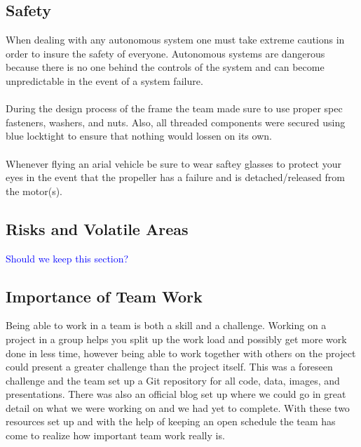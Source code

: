 \documentclass{article}
\numberwithin{equation}{section} %
\begin{document}
\subsection{Safety}
When dealing with any autonomous system one must take extreme cautions in order to insure the safety of everyone. Autonomous systems are dangerous because there is no one behind the controls of the system and can become unpredictable in the event of a system failure. \\ \\ 
During the design process of the frame the team made sure to use proper spec fasteners, washers, and nuts. Also, all threaded components were secured using blue locktight to ensure that nothing would lossen on its own. \\ \\
Whenever flying an arial vehicle be sure to wear saftey glasses to protect your eyes in the event that the propeller has a failure and is detached/released from the motor(s).

\subsection{Risks and Volatile Areas}

\textcolor{blue}{Should we keep this section?}

\subsection{Importance of Team Work}
Being able to work in a team is both a skill and a challenge. Working on a project in a group helps you split up the work load and possibly get more work done in less time, however being able to work together with others on the project could present a greater challenge than the project itself. This was a foreseen challenge and the team set up a Git repository for all code, data, images, and presentations. There was also an official blog set up where we could go in great detail on what we were working on and we had yet to complete. With these two resources set up and with the help of keeping an open schedule the team has come to realize how important team work really is.
\end{document}
